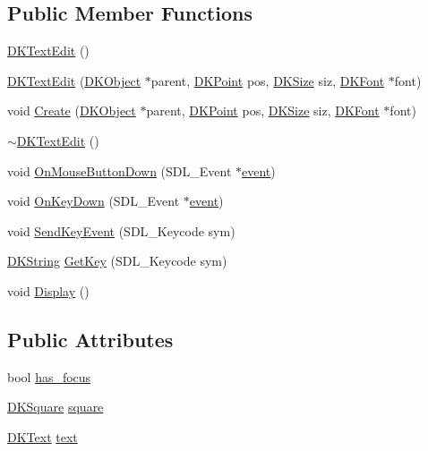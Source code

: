 \subsection*{Public Member Functions}
\begin{DoxyCompactItemize}
\item 
\hyperlink{class_d_k_text_edit_a7323bfa3d2516e27f0bdc2b312d3bf27}{D\-K\-Text\-Edit} ()
\item 
\hyperlink{class_d_k_text_edit_a7995a2daa5331e6afa6f5d06f4670a2a}{D\-K\-Text\-Edit} (\hyperlink{class_d_k_object}{D\-K\-Object} $\ast$parent, \hyperlink{_d_k_axis_8h_a0ca1f005fbb936f8e7a7f2433591f418}{D\-K\-Point} pos, \hyperlink{_d_k_axis_8h_aaa25a8c7cbf504fffdb8a4208ff7a731}{D\-K\-Size} siz, \hyperlink{class_d_k_font}{D\-K\-Font} $\ast$font)
\item 
void \hyperlink{class_d_k_text_edit_a99af4f8ed4f0eb53a2fe25f4cafb7369}{Create} (\hyperlink{class_d_k_object}{D\-K\-Object} $\ast$parent, \hyperlink{_d_k_axis_8h_a0ca1f005fbb936f8e7a7f2433591f418}{D\-K\-Point} pos, \hyperlink{_d_k_axis_8h_aaa25a8c7cbf504fffdb8a4208ff7a731}{D\-K\-Size} siz, \hyperlink{class_d_k_font}{D\-K\-Font} $\ast$font)
\item 
\hyperlink{class_d_k_text_edit_ab32c106cc89536dd2f86c88e592cbcfb}{$\sim$\-D\-K\-Text\-Edit} ()
\item 
void \hyperlink{class_d_k_text_edit_a8dad16809f7642b2a919f0b090105fc8}{On\-Mouse\-Button\-Down} (S\-D\-L\-\_\-\-Event $\ast$\hyperlink{class_d_k_event_a3deebb932ed734363c4ece87971bc45f}{event})
\item 
void \hyperlink{class_d_k_text_edit_a86768e3f3fb36f8b0b7f65fbb7268b42}{On\-Key\-Down} (S\-D\-L\-\_\-\-Event $\ast$\hyperlink{class_d_k_event_a3deebb932ed734363c4ece87971bc45f}{event})
\item 
void \hyperlink{class_d_k_text_edit_a1ba168223dcb45bdf3fd2f95edeb721e}{Send\-Key\-Event} (S\-D\-L\-\_\-\-Keycode sym)
\item 
\hyperlink{_d_k_string_8h_ac168e8555ceba18e1a2919b21976bc84}{D\-K\-String} \hyperlink{class_d_k_text_edit_adec9b4e77b429aeea1aba90fa2572491}{Get\-Key} (S\-D\-L\-\_\-\-Keycode sym)
\item 
void \hyperlink{class_d_k_text_edit_a6fc1d20b0b7e262ef9e5ae3afa0d2742}{Display} ()
\end{DoxyCompactItemize}
\subsection*{Public Attributes}
\begin{DoxyCompactItemize}
\item 
bool \hyperlink{class_d_k_text_edit_a94467483cceaee08bd6156d12f5a558d}{has\-\_\-focus}
\item 
\hyperlink{class_d_k_square}{D\-K\-Square} \hyperlink{class_d_k_text_edit_a6b70903aa2861d4b5bdbf8b829ff5dfc}{square}
\item 
\hyperlink{class_d_k_text}{D\-K\-Text} \hyperlink{class_d_k_text_edit_a282fbac8297f1c45148ae2ac9cfa1000}{text}
\end{DoxyCompactItemize}
